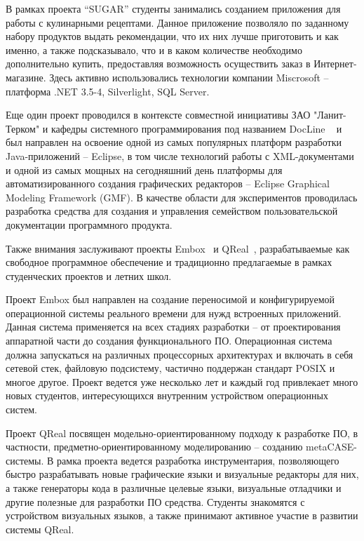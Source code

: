 \documentclass[a5paper]{article}
\begin{document}
В рамках проекта ``SUGAR'' студенты занимались созданием приложения для работы с кулинарными рецептами. Данное приложение позволяло по заданному набору продуктов выдать рекомендации, что их них лучше приготовить и как именно, а также подсказывало, что и в каком количестве необходимо дополнительно купить, предоставляя возможность осуществить заказ в Интернет-магазине. Здесь активно использовались технологии компании Miscrosoft -- платформа .NET 3.5-4, Silverlight, SQL Server.

Еще один проект проводился в контексте совместной инициативы ЗАО "Ланит-Терком" и кафедры системного программирования под названием DocLine ~\cite{docLine1, docLine2, docLine3} и был направлен на освоение одной из самых популярных платформ разработки Java-приложений -- Eclipse, в том числе технологий работы с XML-документами и одной из самых мощных на сегодняшний день платформы для автоматизированного создания графических редакторов -- Eclipse Graphical Modeling Framework (GMF). В качестве области для экспериментов проводилась разработка средства для создания и управления семейством пользовательской документации программного продукта. 
 
Также внимания заслуживают проекты Embox~\cite{embox} и QReal~\cite{qreal}, разрабатываемые как свободное программное обеспечение и традиционно предлагаемые в рамках студенческих проектов и летних школ. 

Проект Embox был направлен на создание переносимой  и конфигурируемой операционной системы реального времени для нужд встроенных приложений. Данная система применяется на всех стадиях разработки -- от проектирования аппаратной части до создания функционального ПО. Операционная система  должна запускаться на различных процессорных архитектурах и включать в себя сетевой стек, файловую подсистему, частично поддержан стандарт POSIX и многое другое. Проект ведется уже несколько лет и каждый год привлекает много новых студентов, интересующихся внутренним устройством операционных систем.  

Проект QReal посвящен модельно-ориентированному подходу к разработке ПО, в частности, предметно-ориентированному моделированию -- созданию metaCASE-системы. В рамка проекта ведется разработка инструментария, позволяющего быстро разрабатывать новые графические языки и визуальные редакторы для них, а также генераторы кода в различные целевые языки, визуальные отладчики и другие полезные для разработки ПО средства. Студенты знакомятся с устройством визуальных языков, а также принимают активное участие в развитии системы QReal.
\end{document}
